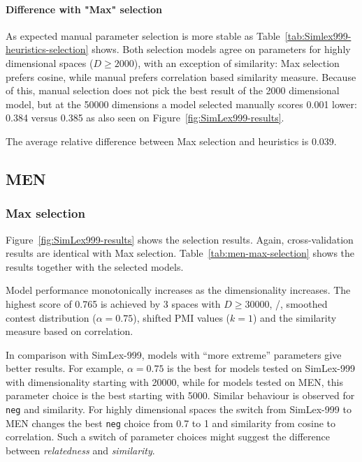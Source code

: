 \paragraph{Difference with "Max" selection}



As expected manual parameter selection is more stable as Table~\ref{tab:Simlex999-heuristics-selection} shows. Both selection models agree on parameters for highly dimensional spaces ($D \geq 2000$), with an exception of similarity: Max selection prefers cosine, while manual prefers correlation based similarity measure. Because of this, manual selection does not pick the best result of the 2000 dimensional model, but at the 50000 dimensions  a model selected manually scores 0.001 lower: 0.384 versus 0.385 as also seen on Figure~\ref{fig:SimLex999-results}.

The average relative difference between Max selection and heuristics is 0.039.

\subsection{MEN}
\label{sec:men}

\subsubsection{Max selection}
\label{sec:max-selection-men}



Figure~\ref{fig:SimLex999-results} shows the selection results. Again, cross-validation results are identical with Max selection. Table~\ref{tab:men-max-selection} shows the results together with the selected models.



Model performance monotonically increases as the dimensionality increases. The highest score of 0.765 is achieved by 3 spaces with $D \geq 30000$, \logNSCPMI/, smoothed contest distribution ($\alpha = 0.75$), shifted PMI values ($k = 1$) and the similarity measure based on correlation.

In comparison with SimLex-999, models with ``more extreme'' parameters give better results. For example, $\alpha = 0.75$ is the best for models tested on SimLex-999 with dimensionality starting with 20000, while for models tested on MEN, this parameter choice is the best starting with 5000. Similar behaviour is observed for \texttt{neg} and similarity. For highly dimensional spaces the switch from SimLex-999 to MEN changes the best \texttt{neg} choice from 0.7 to 1 and similarity from cosine to correlation. Such a switch of parameter choices might suggest the difference between \textit{relatedness} and \textit{similarity}.

